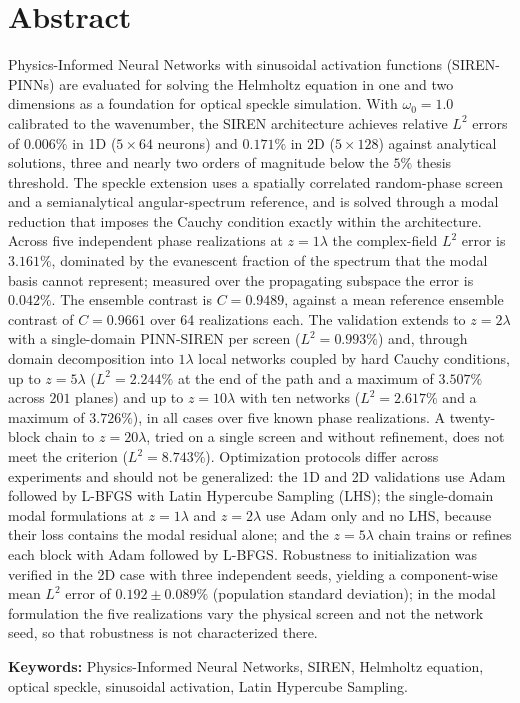 
\chapter*{Abstract}

\vspace*{-8mm}

Physics-Informed Neural Networks with sinusoidal activation functions
(SIREN-PINNs) are evaluated for solving the Helmholtz equation in one and two
dimensions as a foundation for optical speckle simulation. With $\omega_0 = 1.0$
calibrated to the wavenumber, the SIREN architecture achieves relative $L^2$
errors of $0.006\%$ in 1D ($5 \times 64$ neurons) and $0.171\%$ in 2D
($5 \times 128$) against analytical solutions, three and nearly two orders of
magnitude below the $5\%$ thesis threshold.
The speckle extension uses a spatially correlated random-phase screen and a
semianalytical angular-spectrum reference, and is solved through a modal
reduction that imposes the Cauchy condition exactly within the architecture.
Across five independent phase realizations at $z=1\lambda$ the complex-field
$L^2$ error is $3.161\%$, dominated by the evanescent fraction of the spectrum
that the modal basis cannot represent; measured over the propagating subspace
the error is $0.042\%$. The ensemble contrast is $C=0.9489$, against a mean
reference ensemble contrast of $C=0.9661$ over 64 realizations each.
The validation extends to $z=2\lambda$ with a single-domain PINN-SIREN per
screen
($L^2=0.993\%$) and, through domain decomposition into $1\lambda$ local
networks coupled by hard Cauchy conditions, up to $z=5\lambda$ ($L^2=2.244\%$
at the end of the path and a maximum of $3.507\%$ across $201$ planes) and up
to $z=10\lambda$ with ten networks ($L^2=2.617\%$ and a maximum of $3.726\%$),
in all cases over five known phase realizations. A twenty-block chain to
$z=20\lambda$, tried on a single screen and without refinement, does not meet
the criterion ($L^2=8.743\%$).
Optimization protocols differ across experiments and should not be
generalized: the 1D and 2D validations use Adam followed by L-BFGS with Latin
Hypercube Sampling (LHS); the single-domain modal formulations at $z=1\lambda$
and $z=2\lambda$ use Adam only and no LHS, because their loss contains the modal
residual alone; and the $z=5\lambda$ chain trains or refines each block with
Adam followed by L-BFGS. Robustness to initialization was verified in the 2D case
with three independent seeds, yielding a component-wise mean $L^2$ error of
$0.192 \pm 0.089\%$ (population standard deviation); in the modal formulation the
five realizations vary the physical screen and not the network seed, so that
robustness is not characterized there.

\bigskip

\noindent\textbf{Keywords:} Physics-Informed Neural Networks, SIREN,
Helmholtz equation, optical speckle, sinusoidal activation, Latin Hypercube
Sampling.

